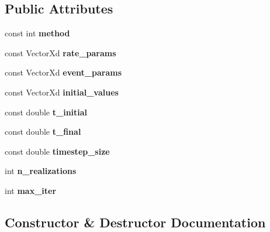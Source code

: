 \subsection*{Public Attributes}
\begin{DoxyCompactItemize}
\item 
\mbox{\label{class_paramset_a67376577973f825ba60fc7c319ccc906}} 
const int {\bfseries method}
\item 
\mbox{\label{class_paramset_a0bde34e534a67451a5e9317c9a1c8a81}} 
const Vector\+Xd {\bfseries rate\+\_\+params}
\item 
\mbox{\label{class_paramset_a25079a96917e88458073dedd724f2b68}} 
const Vector\+Xd {\bfseries event\+\_\+params}
\item 
\mbox{\label{class_paramset_ad7db1c48bae63ad5b392a7b4de9f5d56}} 
const Vector\+Xd {\bfseries initial\+\_\+values}
\item 
\mbox{\label{class_paramset_a7d82a76c08567e5072aa1b125708c7d8}} 
const double {\bfseries t\+\_\+initial}
\item 
\mbox{\label{class_paramset_ac88cde461d8dbbd8a7d2636fc45f7119}} 
const double {\bfseries t\+\_\+final}
\item 
\mbox{\label{class_paramset_a0554913cf803a67bc59ffdee154abc24}} 
const double {\bfseries timestep\+\_\+size}
\item 
\mbox{\label{class_paramset_a50c0325e75983b66d0825406ec7873ac}} 
int {\bfseries n\+\_\+realizations}
\item 
\mbox{\label{class_paramset_afeb86c327cd6966707996019609e6ed1}} 
int {\bfseries max\+\_\+iter}
\end{DoxyCompactItemize}


\subsection{Constructor \& Destructor Documentation}
\mbox{\label{class_paramset_a2893c9f0d0ad896fd1f55d4cda734cbd}} 
